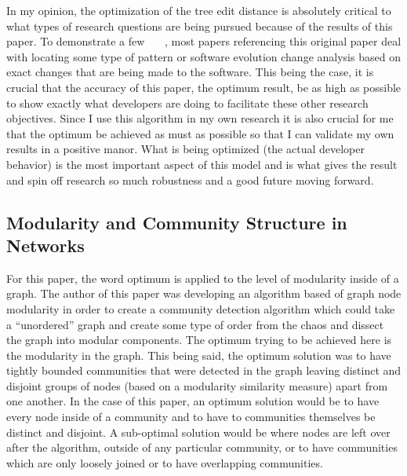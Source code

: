 \documentclass[conference]{IEEEtran}
\begin{document}
In my opinion, the optimization of the tree edit distance is absolutely critical to what types of research questions are being pursued
because of the results of this paper. To demonstrate a few~\cite{Brudaru:2008:LIC:1454247.1454257}~\cite{Ratzinger:2008:RRS:1370750.1370759}
~\cite{Fluri:2008:DPC:1642931.1643000}, most papers referencing this original paper deal with locating some type of pattern or 
software evolution change analysis based on exact changes that are being made to the software. This being the case, it is crucial that the
accuracy of this paper, the optimum result, be as high as possible to show exactly what developers are doing to facilitate these other
research objectives. Since I use this algorithm in my own research it is also crucial for me that the optimum be achieved as must as possible
so that I can validate my own results in a positive manor. What is being optimized (the actual developer behavior) is the most important
aspect of this model and is what gives the result and spin off research so much robustness and a good future moving forward.

\subsection{Modularity and Community Structure in Networks}

For this paper, the word optimum is applied to the level of modularity inside of a graph. The author of this paper was developing
an algorithm based of graph node modularity in order to create a community detection algorithm which could take a ``unordered'' graph
and create some type of order from the chaos and dissect the graph into modular components. The optimum trying to be achieved here
is the modularity in the graph. This being said, the optimum solution was to have tightly bounded communities that were detected
in the graph leaving distinct and disjoint groups of nodes (based on a modularity similarity measure) apart from one another. In the
case of this paper, an optimum solution would be to have every node inside of a community and to have to communities themselves
be distinct and disjoint. A sub-optimal solution would be where nodes are left over after the algorithm, outside of any particular
community, or to have communities which are only loosely joined or to have overlapping communities. 
\end{document}
